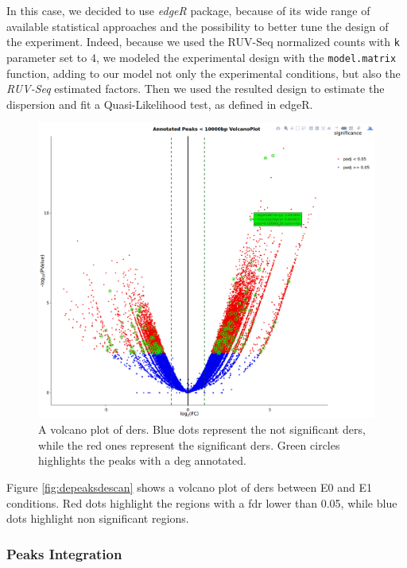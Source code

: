 In this case, we decided to use \textit{edgeR} package, because of its wide range of  available statistical approaches and the possibility to better tune the design of the experiment. 
Indeed, because we used the RUV-Seq normalized counts with \lstinline!k! parameter set to 4, we modeled the experimental design with the \lstinline!model.matrix! function, adding to our model not only the experimental conditions, but also the \textit{RUV-Seq} estimated factors.
Then we used the resulted design to estimate the dispersion and fit a Quasi-Likelihood test, as defined in edgeR\cite{Robinson2009}.
 
\begin{figure}[H]
\centering
\includegraphics[width=\textwidth, keepaspectratio]{img/descan2/Annotated_depeaks_degenes.png}
\caption[Annotated Differential Enrichment Regions Volcano]{A volcano plot of \glspl{der}. Blue dots represent the not significant \glspl{der}, while the red ones represent the significant \glspl{der}. Green circles highlights the peaks with a \gls{deg} annotated.}
\label{fig:depeakdegenessdescan}
\centering
\end{figure}

Figure \ref{fig:depeaksdescan} shows a volcano plot of \glspl{der} between E0 and E1 conditions.
Red dots highlight the regions with a \gls{fdr}\cite{Benjamini1995} lower than 0.05, while blue dots highlight non significant regions.

\subsubsection{Peaks Integration}

